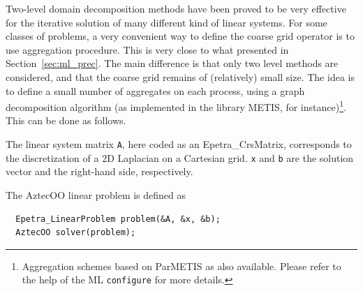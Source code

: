 Two-level domain decomposition methods have been proved to be very
effective for the iterative solution of many different kind of linear
systems.  For some classes of problems, a very convenient way to define
the coarse grid operator is to use aggregation procedure. This is very
close to what presented in Section~\ref{sec:ml_prec}. The main
difference is that only two level methods are considered, and that the
coarse grid remains of (relatively) small size. The idea is to define a
small number of aggregates on each process, using a graph decomposition
algorithm (as implemented in the library METIS, for
instance)\footnote{Aggregation schemes based on ParMETIS as also
  available. Please refer to the help of the ML {\tt configure} for more
  details.}. This can be done as follows.

The linear system matrix \verb!A!, here coded as an Epetra\_CrsMatrix,
corresponds to the discretization of a 2D Laplacian on a Cartesian
grid. \verb!x! and \verb!b! are the solution vector and the right-hand
side, respectively.

The AztecOO linear problem is defined as
\begin{verbatim}
  Epetra_LinearProblem problem(&A, &x, &b);
  AztecOO solver(problem);
\end{verbatim}

